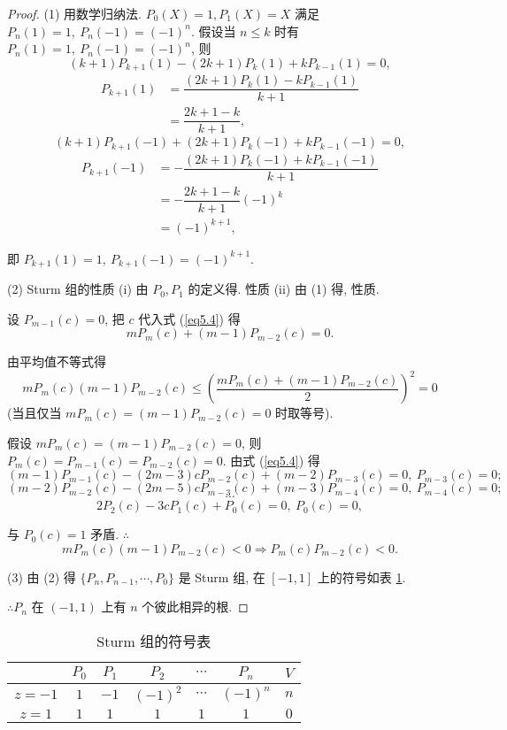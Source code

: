 \documentclass[color=black,device=normal,lang=cn,mode=geye]{elegantnote}
\begin{document}
\begin{proof}
    (1) 用数学归纳法. $P_0(X)=1,P_1(X)=X$ 满足 $P_n(1)=1,\ P_n(-1)=(-1)^n$. 假设当 $n\leq k$ 时有 $P_n(1)=1,\ P_n(-1)=(-1)^n$, 则
    \[(k+1)P_{k+1}(1)-(2k+1)P_k(1)+kP_{k-1}(1)=0,\]
    \begin{align*}
        P_{k+1}(1) & =\dfrac{(2k+1)P_k(1)-kP_{k-1}(1)}{k+1} \\
        & =\dfrac{2k+1-k}{k+1},
    \end{align*}
    \[(k+1)P_{k+1}(-1)+(2k+1)P_k(-1)+kP_{k-1}(-1)=0,\]
    \begin{align*}
        P_{k+1}(-1) & =-\dfrac{(2k+1)P_k(-1)+kP_{k-1}(-1)}{k+1} \\
        & =-\dfrac{2k+1-k}{k+1}(-1)^k \\
        & =(-1)^{k+1},
    \end{align*}

    即 $P_{k+1}(1)=1,\ P_{k+1}(-1)=(-1)^{k+1}$.

    (2) Sturm 组的性质 (i) 由 $P_0,P_1$ 的定义得. 性质 (ii) 由 (1) 得, 性质.

    设 $P_{m-1}(c)=0$, 把 $c$ 代入式 (\ref{eq5.4}) 得
    \[mP_m(c)+(m-1)P_{m-2}(c)=0.\]

    由平均值不等式得
    \[mP_m(c)(m-1)P_{m-2}(c)\leq\left(\dfrac{mP_m(c)+(m-1)P_{m-2}(c)}{2}\right)^2=0\]
    (当且仅当 $mP_m(c)=(m-1)P_{m-2}(c)=0$ 时取等号).

    假设 $mP_m(c)=(m-1)P_{m-2}(c)=0$, 则 $P_m(c)=P_{m-1}(c)=P_{m-2}(c)=0$. 由式 (\ref{eq5.4}) 得
    \[(m-1)P_{m-1}(c)-(2m-3)cP_{m-2}(c)+(m-2)P_{m-3}(c)=0,\ P_{m-3}(c)=0;\]
    \[(m-2)P_{m-2}(c)-(2m-5)cP_{m-3}(c)+(m-3)P_{m-4}(c)=0,\ P_{m-4}(c)=0;\]
    \[\cdots\]
    \[2P_2(c)-3cP_1(c)+P_0(c)=0,\ P_0(c)=0,\]

    与 $P_0(c)=1$ 矛盾. $\therefore$
    \[mP_m(c)(m-1)P_{m-2}(c)<0\Rightarrow P_m(c)P_{m-2}(c)<0.\]

    (3) 由 (2) 得 $\{P_n,P_{n-1},\cdots,P_0\}$ 是 Sturm 组, 在 $[-1,1]$ 上的符号如表 \ref{tb4}.

    $\therefore P_n$ 在 $(-1,1)$ 上有 $n$ 个彼此相异的根.
\end{proof}
\begin{table}\caption{Sturm 组的符号表}\label{tb4}
    \centering
    \begin{tabular}{c|ccccc|c}
        & $P_0$ & $P_1$ & $P_2$ & $\cdots$ & $P_n$ & $V$ \\
        \hline
        $z=-1$ & $1$ & $-1$ & $(-1)^2$ & $\cdots$ & $(-1)^n$ & $n$ \\
        $z=1$  & $1$ & $1$ & $1$ & $1$ & $1$ & $0$ \\
    \end{tabular}
\end{table}
\end{document}
